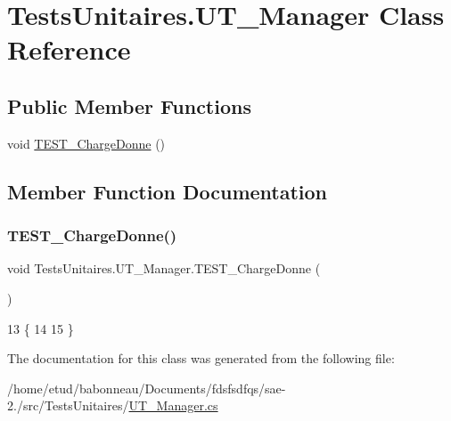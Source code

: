 \hypertarget{classTestsUnitaires_1_1UT__Manager}{}\section{Tests\+Unitaires.\+U\+T\+\_\+\+Manager Class Reference}
\label{classTestsUnitaires_1_1UT__Manager}
\subsection*{Public Member Functions}
\begin{DoxyCompactItemize}
\item 
void \hyperlink{classTestsUnitaires_1_1UT__Manager_a187003e86b5d8add2d607d4d882e4226}{T\+E\+S\+T\+\_\+\+Charge\+Donne} ()
\end{DoxyCompactItemize}


\subsection{Member Function Documentation}
\mbox{\label{classTestsUnitaires_1_1UT__Manager_a187003e86b5d8add2d607d4d882e4226}} 
\subsubsection{\texorpdfstring{T\+E\+S\+T\+\_\+\+Charge\+Donne()}{TEST\_ChargeDonne()}}
{\footnotesize\ttfamily void Tests\+Unitaires.\+U\+T\+\_\+\+Manager.\+T\+E\+S\+T\+\_\+\+Charge\+Donne (\begin{DoxyParamCaption}{ }\end{DoxyParamCaption})\hspace{0.3cm}{\ttfamily [inline]}}


\begin{DoxyCode}
13         \{
14 
15         \}
\end{DoxyCode}


The documentation for this class was generated from the following file\+:\begin{DoxyCompactItemize}
\item 
/home/etud/babonneau/\+Documents/fdsfsdfqs/sae-\/2./src/\+Tests\+Unitaires/\hyperlink{UT__Manager_8cs}{U\+T\+\_\+\+Manager.\+cs}\end{DoxyCompactItemize}
